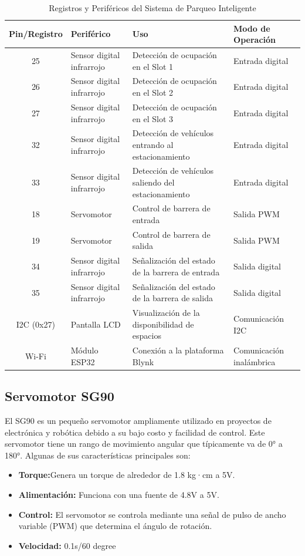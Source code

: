 \documentclass[12pt,a4paper]{article}
\begin{document}
\begin{table}[H]
\centering
\caption{Registros y Periféricos del Sistema de Parqueo Inteligente}
\label{tab:registros_perifericos}
\begin{tabularx}{\textwidth}{|c|X|X|X|}
\hline
\textbf{Pin/Registro} & \textbf{Periférico} & \textbf{Uso} & \textbf{Modo de Operación} \\ \hline
25 & Sensor digital infrarrojo & Detección de ocupación en el Slot 1 & Entrada digital \\ \hline
26 & Sensor digital infrarrojo & Detección de ocupación en el Slot 2 & Entrada digital \\ \hline
27 & Sensor digital infrarrojo & Detección de ocupación en el Slot 3 & Entrada digital \\ \hline
32 & Sensor digital infrarrojo & Detección de vehículos entrando al estacionamiento & Entrada digital \\ \hline
33 & Sensor digital infrarrojo & Detección de vehículos saliendo del estacionamiento & Entrada digital \\ \hline
18 & Servomotor & Control de barrera de entrada & Salida PWM \\ \hline
19 & Servomotor & Control de barrera de salida & Salida PWM \\ \hline
34 & Sensor digital infrarrojo & Señalización del estado de la barrera de entrada & Salida digital \\ \hline
35 & Sensor digital infrarrojo & Señalización del estado de la barrera de salida & Salida digital \\ \hline
I2C (0x27) & Pantalla LCD & Visualización de la disponibilidad de espacios & Comunicación I2C \\ \hline
Wi-Fi & Módulo ESP32 & Conexión a la plataforma Blynk & Comunicación inalámbrica \\ \hline
\end{tabularx}
\end{table}

\subsection{Servomotor SG90}
El SG90 \cite{sg90} es un pequeño servomotor ampliamente utilizado en proyectos de electrónica y robótica debido a su bajo costo y facilidad de control. Este servomotor tiene un rango de movimiento angular que típicamente va de 0° a 180°. Algunas de sus características principales son:

\begin{itemize}
    \item \textbf{Torque:}Genera un torque de alrededor de 1.8 kg·cm a 5V.
    \item \textbf{Alimentación:} Funciona con una fuente de 4.8V a 5V.
    \item \textbf{Control:} El servomotor se controla mediante una señal de pulso de ancho variable (PWM) que determina el ángulo de rotación.
    \item \textbf{Velocidad:} 0.1s/60 degree
\end{itemize}
\end{document}

